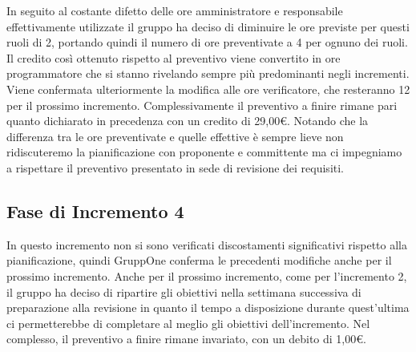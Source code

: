 \documentclass[../piano-di-progetto.tex]{subfiles}
\begin{document}
In seguito al costante difetto delle ore amministratore e responsabile effettivamente utilizzate il gruppo ha deciso di diminuire le ore previste per questi ruoli di 2, portando quindi il numero di ore preventivate a 4 per ognuno dei ruoli.
Il credito così ottenuto rispetto al preventivo viene convertito in ore programmatore che si stanno rivelando sempre più predominanti negli incrementi.
Viene confermata ulteriormente la modifica alle ore verificatore, che resteranno 12 per il prossimo incremento.
Complessivamente il preventivo a finire rimane pari quanto dichiarato in precedenza con un credito di 29,00€.
Notando che la differenza tra le ore preventivate e quelle effettive è sempre lieve non ridiscuteremo la pianificazione con proponente e committente ma ci impegniamo a rispettare il preventivo presentato in sede di revisione dei requisiti.



\subsection{Fase di Incremento 4}%
\label{sub:preventivo_a_finire/fase_di_incremento_4}

In questo incremento non si sono verificati discostamenti significativi rispetto alla pianificazione, quindi GruppOne conferma le precedenti modifiche anche per il prossimo incremento.
Anche per il prossimo incremento, come per l'incremento 2, il gruppo ha deciso di ripartire gli obiettivi nella settimana successiva di preparazione alla revisione in quanto il tempo a disposizione durante quest'ultima ci permetterebbe di completare al meglio gli obiettivi dell'incremento.
Nel complesso, il preventivo a finire rimane invariato, con un debito di 1,00€.


\end{document}
